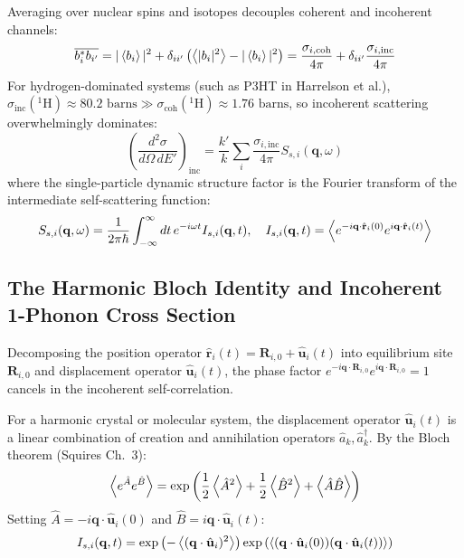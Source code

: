 \documentclass[11pt,a4paper]{article}
\theoremstyle{definition}
\begin{document}
Averaging over nuclear spins and isotopes decouples coherent and incoherent channels:
\begin{equation}
\overline{b_i^* b_{i'}} = |\ev{b_i}|^2 + \delta_{ii'} \left( \ev{|b_i|^2} - |\ev{b_i}|^2 \right) = \frac{\sigma_{i,\text{coh}}}{4\pi} + \delta_{ii'} \frac{\sigma_{i,\text{inc}}}{4\pi}
\end{equation}
For hydrogen-dominated systems (such as P3HT in Harrelson et al.), $\sigma_{\text{inc}}(^1\text{H}) \approx 80.2\text{ barns} \gg \sigma_{\text{coh}}(^1\text{H}) \approx 1.76\text{ barns}$, so incoherent scattering overwhelmingly dominates:
\begin{equation}
\left( \frac{d^2\sigma}{d\Omega \, dE'} \right)_{\text{inc}} = \frac{k'}{k} \sum_i \frac{\sigma_{i,\text{inc}}}{4\pi} S_{s,i}(\mathbf{q}, \omega)
\end{equation}
where the single-particle dynamic structure factor is the Fourier transform of the intermediate self-scattering function:
\begin{equation}
S_{s,i}(\mathbf{q}, \omega) = \frac{1}{2\pi \hbar} \int_{-\infty}^\infty dt \, e^{-i\omega t} I_{s,i}(\mathbf{q}, t), \quad I_{s,i}(\mathbf{q}, t) = \ev{e^{-i\mathbf{q}\cdot \hat{\mathbf{r}}_i(0)} e^{i\mathbf{q}\cdot \hat{\mathbf{r}}_i(t)}}
\end{equation}

\subsection{The Harmonic Bloch Identity and Incoherent 1-Phonon Cross Section}
Decomposing the position operator $\hat{\mathbf{r}}_i(t) = \mathbf{R}_{i,0} + \hat{\mathbf{u}}_i(t)$ into equilibrium site $\mathbf{R}_{i,0}$ and displacement operator $\hat{\mathbf{u}}_i(t)$, the phase factor $e^{-i\mathbf{q}\cdot \mathbf{R}_{i,0}} e^{i\mathbf{q}\cdot \mathbf{R}_{i,0}} = 1$ cancels in the incoherent self-correlation.

For a harmonic crystal or molecular system, the displacement operator $\hat{\mathbf{u}}_i(t)$ is a linear combination of creation and annihilation operators $\hat{a}_k, \hat{a}_k^\dagger$. By the Bloch theorem (Squires Ch.~3):
\begin{equation}
\ev{e^{\hat{A}} e^{\hat{B}}} = \exp\left( \frac{1}{2}\ev{\hat{A}^2} + \frac{1}{2}\ev{\hat{B}^2} + \ev{\hat{A}\hat{B}} \right)
\end{equation}
Setting $\hat{A} = -i\mathbf{q}\cdot \hat{\mathbf{u}}_i(0)$ and $\hat{B} = i\mathbf{q}\cdot \hat{\mathbf{u}}_i(t)$:
\begin{equation}
I_{s,i}(\mathbf{q}, t) = \exp\left( -\ev{(\mathbf{q}\cdot \hat{\mathbf{u}}_i)^2} \right) \exp\left( \ev{(\mathbf{q}\cdot \hat{\mathbf{u}}_i(0))(\mathbf{q}\cdot \hat{\mathbf{u}}_i(t))} \right)
\end{equation}
\end{document}
